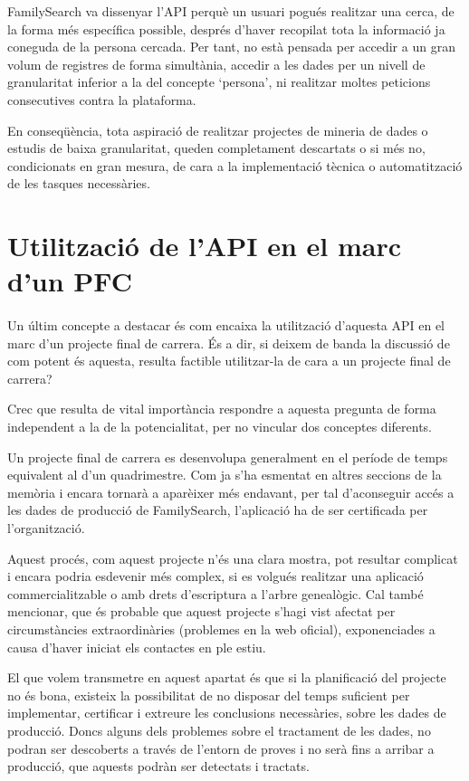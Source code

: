     FamilySearch va dissenyar l'API perquè un usuari pogués realitzar una cerca, de la forma més específica possible, després d'haver recopilat tota la informació ja coneguda de la persona cercada. Per tant, no està pensada per accedir a un gran volum de registres de forma simultània, accedir a les dades per un nivell de granularitat inferior a la del concepte `persona', ni realitzar moltes peticions consecutives contra la plataforma.

    En conseqüència, tota aspiració de realitzar projectes de mineria de dades o estudis de baixa granularitat, queden completament descartats o si més no, condicionats en gran mesura, de cara a la implementació tècnica o automatització de les tasques necessàries.


\section{Utilització de l'API en el marc d'un PFC}

    \paragraph{}
    Un últim concepte a destacar és com encaixa la utilització d'aquesta API en el marc d'un projecte final de carrera. És a dir, si deixem de banda la discussió de com potent és aquesta, resulta factible utilitzar-la de cara a un projecte final de carrera?

    Crec que resulta de vital importància respondre a aquesta pregunta de forma independent a la de la potencialitat, per no vincular dos conceptes diferents.

    Un projecte final de carrera es desenvolupa generalment en el període de temps equivalent al d'un quadrimestre. Com ja s'ha esmentat en altres seccions de la memòria i encara tornarà a aparèixer més endavant, per tal d'aconseguir accés a les dades de producció de FamilySearch, l'aplicació ha de ser certificada per l'organització.

    Aquest procés, com aquest projecte n'és una clara mostra, pot resultar complicat i encara podria esdevenir més complex, si es volgués realitzar una aplicació commercialitzable o amb drets d'escriptura a l'arbre genealògic. Cal també mencionar, que és probable que aquest projecte s'hagi vist afectat per circumstàncies extraordinàries (problemes en la web oficial), exponenciades a causa d'haver iniciat els contactes en ple estiu.

    El que volem transmetre en aquest apartat és que si la planificació del projecte no és bona, existeix la possibilitat de no disposar del temps suficient per implementar, certificar i extreure les conclusions necessàries, sobre les dades de producció. Doncs alguns dels problemes sobre el tractament de les dades, no podran ser descoberts a través de l'entorn de proves i no serà fins a arribar a producció, que aquests podràn ser detectats i tractats.

